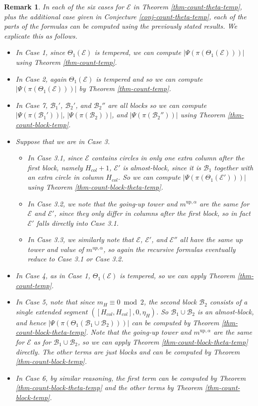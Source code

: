 \documentclass[11pt,letterpaper]{amsart}
\newcommand{\up}{{\mathrm{up}}}
\newcommand{\BB}{\mathcal{B}}
\newcommand{\EE}{\mathcal{E}}
\newtheorem{rmk}[thm]{Remark}
\numberwithin{equation}{section}
\begin{document}
\begin{rmk}\label{rmk going up packets calculation}
    In each of the six cases for $\EE$ in Theorem \ref{thm-count-theta-temp}, plus the additional case given in Conjecture \ref{conj-count-theta-temp}, each of the parts of the formulas can be computed using the previously stated results. We explicate this as follows.
    \begin{itemize}
    \item In Case 1, since $\Theta_1(\EE)$ is tempered, we can compute $|\Psi(\pi(\Theta_1(\EE)))|$ using Theorem \ref{thm-count-temp}.
        \item In Case 2, again $\Theta_1(\EE)$ is tempered and so we can compute $|\Psi(\pi(\Theta_1(\EE)))|$ by Theorem \ref{thm-count-temp}.
        \item In Case 7, $\BB_1'$, $\BB_2'$, and $\BB_2''$ are all blocks so we can compute $|\Psi(\pi(\BB_1'))|$, $|\Psi(\pi(\BB_2))|$, and $|\Psi(\pi(\BB_2''))|$ using Theorem \ref{thm-count-block-temp}.
        \item Suppose that we are in Case 3.
        \begin{itemize}
            \item In Case 3.1, since $\EE$ contains circles in only one extra column after the first block, namely $H_{col}+1$, $\EE'$ is almost-block, since it is $\BB_1$ together with an extra circle in column $H_{col}$. So we can compute $|\Psi(\pi(\Theta_1(\EE')))|$ using Theorem \ref{thm-count-block-theta-temp}.
            \item In Case 3.2, we note that the going-up tower and $m^{\up, \alpha}$ are the same for $\EE$ and $\EE'$, since they only differ in columns after the first block, so in fact $\EE'$ falls directly into Case 3.1.
            \item In Case 3.3, we similarly note that $\EE$, $\EE'$, and $\EE''$ all have the same up tower and value of $m^{up, \alpha}$, so again the recursive formulas eventually reduce to Case 3.1 or Case 3.2.
        \end{itemize}
        \item In Case 4, as in Case 1, $\Theta_1(\EE)$ is tempered, so we can apply Theorem \ref{thm-count-temp}.
        \item In Case 5, note that since $m_H \equiv 0 \bmod{2}$, the second block $\BB_2$ consists of a single extended segment $([H_{col}, H_{col}], 0, \eta_H)$. So $\BB_1 \cup \BB_2$ is an almost-block, and hence $|\Psi(\pi(\Theta_1(\BB_1 \cup \BB_2)))|$ can be computed by Theorem \ref{thm-count-block-theta-temp}. Note that the going-up tower and $m^{\up, \alpha}$ are the same for $\EE$ as for $\BB_1 \cup \BB_2$, so we can apply Theorem \ref{thm-count-block-theta-temp} directly. The other terms are just blocks and can be computed by Theorem \ref{thm-count-block-temp}.
        \item In Case 6, by similar reasoning, the first term can be computed by Theorem \ref{thm-count-block-theta-temp} and the other terms by Theorem \ref{thm-count-block-temp}.
    \end{itemize}
\end{rmk}
\end{document}
